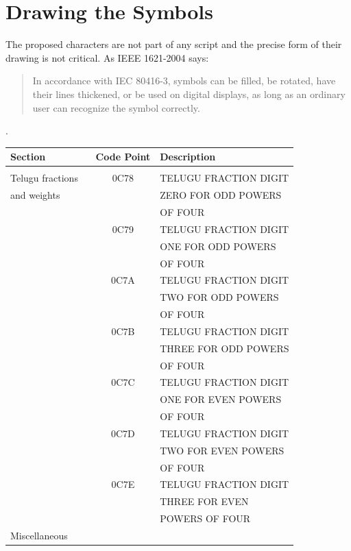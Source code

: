\documentclass[10pt,a4paper]{article}
\begin{document}
\section{Drawing the Symbols}

The proposed characters are not part of any script and the precise form of
their drawing is not critical. As IEEE 1621-2004 says:

\begin{quote}
In accordance with IEC 80416-3, symbols can be filled, be rotated, have their lines
thickened, or be used on digital displays, as long as an ordinary user can recognize
the symbol correctly.
\end{quote}

\noindent \cite[\S 4.3]{IEEE1621}.

\begin{table}[htbp]
	\centering
	\begin{tabular}{lcl}
		\textbf{Section} & \textbf{Code Point} & \textbf{Description} \\
		\hline \\
		Telugu fractions \
			& 0C78 & TELUGU FRACTION DIGIT \\
		and weights	& & ZERO FOR ODD POWERS \\
				& & OF FOUR \\
			& 0C79 & TELUGU FRACTION DIGIT \\
				& & ONE FOR ODD POWERS \\
				& & OF FOUR \\
			& 0C7A & TELUGU FRACTION DIGIT \\
				& & TWO FOR ODD POWERS \\
				& & OF FOUR \\
			& 0C7B & TELUGU FRACTION DIGIT \\
				& & THREE FOR ODD POWERS \\
				& & OF FOUR \\
			& 0C7C & TELUGU FRACTION DIGIT \\
				& & ONE FOR EVEN POWERS \\
				& & OF FOUR \\
			& 0C7D & TELUGU FRACTION DIGIT \\
				& & TWO FOR EVEN POWERS \\
				& & OF FOUR \\
			& 0C7E & TELUGU FRACTION DIGIT \\
				& & THREE FOR EVEN \\
				& & POWERS OF FOUR \\
		\hline
		Miscellaneous \

\end{tabular}
\end{table}
\end{document}
